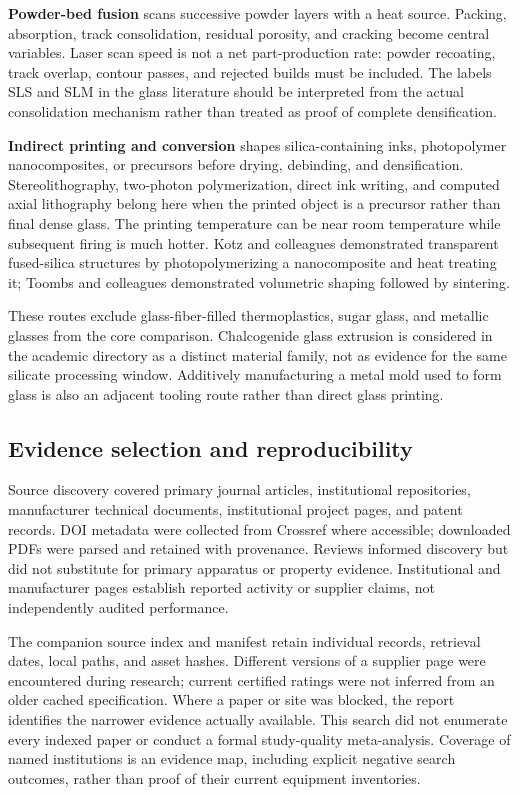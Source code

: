 \textbf{Powder-bed fusion} scans successive powder layers with a heat source. Packing, absorption, track consolidation, residual porosity, and cracking become central variables. Laser scan speed is not a net part-production rate: powder recoating, track overlap, contour passes, and rejected builds must be included. The labels SLS and SLM in the glass literature should be interpreted from the actual consolidation mechanism rather than treated as proof of complete densification.\cite{phys_datsiou}

\textbf{Indirect printing and conversion} shapes silica-containing inks, photopolymer nanocomposites, or precursors before drying, debinding, and densification. Stereolithography, two-photon polymerization, direct ink writing, and computed axial lithography belong here when the printed object is a precursor rather than final dense glass. The printing temperature can be near room temperature while subsequent firing is much hotter. Kotz and colleagues demonstrated transparent fused-silica structures by photopolymerizing a nanocomposite and heat treating it; Toombs and colleagues demonstrated volumetric shaping followed by sintering.\cite{phys_kotz,phys_toombs}

These routes exclude glass-fiber-filled thermoplastics, sugar glass, and metallic glasses from the core comparison. Chalcogenide glass extrusion is considered in the academic directory as a distinct material family, not as evidence for the same silicate processing window. Additively manufacturing a metal mold used to form glass is also an adjacent tooling route rather than direct glass printing.

\subsection{Evidence selection and reproducibility}
Source discovery covered primary journal articles, institutional repositories, manufacturer technical documents, institutional project pages, and patent records. DOI metadata were collected from Crossref where accessible; downloaded PDFs were parsed and retained with provenance. Reviews informed discovery but did not substitute for primary apparatus or property evidence. Institutional and manufacturer pages establish reported activity or supplier claims, not independently audited performance.

The companion source index and manifest retain individual records, retrieval dates, local paths, and asset hashes. Different versions of a supplier page were encountered during research; current certified ratings were not inferred from an older cached specification. Where a paper or site was blocked, the report identifies the narrower evidence actually available. This search did not enumerate every indexed paper or conduct a formal study-quality meta-analysis. Coverage of named institutions is an evidence map, including explicit negative search outcomes, rather than proof of their current equipment inventories.

